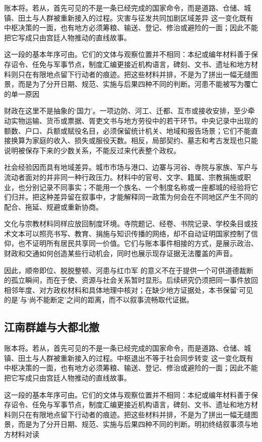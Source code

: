 账本将。若从，首先可见的不是一条已经完成的国家命令，而是道路、仓储、城镇、田土与人群被重新接入的过程。灾害与征发共同加剧区域差异 这一变化既有中枢决策的一面，也有地方必须筹粮、输送、登记、修治或避险的一面；因此不能把它写成只由宫廷人物推动的直线故事。

这一段的基本年序可由。它们的文体与观察位置并不相同：本纪或编年材料善于保存诏令、任免与军事节点，制度汇编更接近机构语言，碑刻、文书、遗址和地方材料则只在有限地点留下行动者的痕迹。把这些材料并排，不是为了拼出一幅无缝图景，而是为了分开日期、规范、实施与后果四种不同的判断。河患不能被写为覆亡的单一原因

财政在这里不是抽象的‘国力’。一项边防、河工、迁都、互市或接收安排，至少牵动实物运输、货币或票据、胥吏文书与地方劳役中的若干环节。中央记录中出现的额数、户口、兵额或赋役名目，必须保留统计机关、地域和报告场景；它们不能直接换算为家庭的收入、损失或服役天数。相反，局部契约、墓志和考古发现也只能说明被保存下来的少数关系，不能反过来代表整个政权。

社会经验因而具有地域差异。城市市场与港口、边寨与河谷、寺院与家族、军户与流动者面对的并非同一种行政压力。材料中的官号、文字、籍属、宗教捐施或职业，也分别记录不同事实；不能用一个族名、一个制度名称或一座都城的经验将它们归并。把这种差异留在叙事中，才能解释同一政策为何会在不同地区产生不同的配合、拖延、规避或重新协商。

文化与宗教材料同样应放回制度环境。寺院题记、经卷、书院记录、学校条目或技术文本可以照亮书写、教育、捐施与知识传播的网络，却不自动证明国家控制了信仰，也不证明所有居民共享同一价值。它们与账本事件相接的方式，是展示政治、财政和交通如何创造某些行动机会，同时也展示现存证据无法覆盖的声音。

因此，顺帝即位、脱脱整顿、河患与红巾军 的意义不在于提供一个可供道德裁断的孤立瞬间，而在于使、资源与社会关系暂时显形。后续研究仍须把同一事件放回相邻年度、对方政权材料和具体地理中核对；在缺少地方证据处，本书保留‘可见的是’与‘尚不能断定’之间的距离，而不以叙事流畅取代证据。

\subsection{江南群雄与大都北撤}

账本将。若从，首先可见的不是一条已经完成的国家命令，而是道路、仓储、城镇、田土与人群被重新接入的过程。中枢退出不等于社会同步转变 这一变化既有中枢决策的一面，也有地方必须筹粮、输送、登记、修治或避险的一面；因此不能把它写成只由宫廷人物推动的直线故事。

这一段的基本年序可由。它们的文体与观察位置并不相同：本纪或编年材料善于保存诏令、任免与军事节点，制度汇编更接近机构语言，碑刻、文书、遗址和地方材料则只在有限地点留下行动者的痕迹。把这些材料并排，不是为了拼出一幅无缝图景，而是为了分开日期、规范、实施与后果四种不同的判断。明初终结叙事须与地方材料对读

